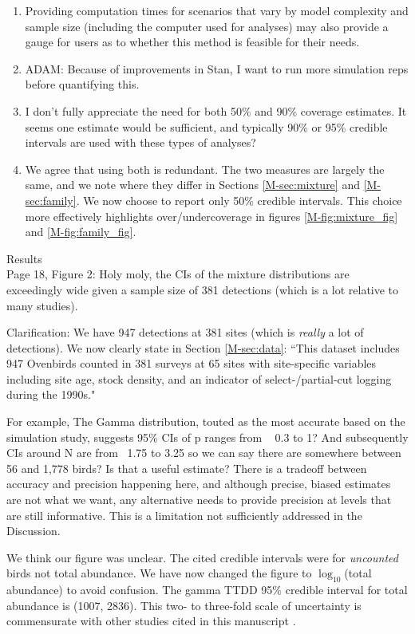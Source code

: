 \documentclass[12pt]{article}
\renewenvironment{quote}  %
              {\list{}{\rightmargin\leftmargin}\normalfont%
               \item\relax}
              {\endlist}
\newcommand{\adam}[1]{{\color{blue} ADAM: #1}}
\begin{document}
\begin{enumerate}
\item Providing computation times for scenarios that vary by model complexity and sample size (including the computer used for analyses) may also provide a gauge for users as to whether this method is feasible for their needs.
\begin{quote}
\adam{Because of improvements in Stan, I want to run more simulation reps before quantifying this.}
\end{quote}

\item I don’t fully appreciate the need for both 50\% and 90\% coverage estimates.  It seems one estimate would be sufficient, and typically 90\% or 95\% credible intervals are used with these types of analyses?
\begin{quote}
We agree that using both is redundant.
The two measures are largely the same, and we note where they differ in Sections \ref{M-sec:mixture} and \ref{M-sec:family}.
We now choose to report only 50\% credible intervals.
This choice more effectively highlights over/undercoverage in figures \ref{M-fig:mixture_fig} and \ref{M-fig:family_fig}.

\end{quote}
\end{enumerate}

Results\\
Page 18, Figure 2:  Holy moly, the CIs of the mixture distributions are exceedingly wide given a sample size of 381 detections (which is a lot relative to many studies).
\begin{quote}
Clarification: We have 947 detections at 381 sites (which is \textit{really} a lot of detections).
We now clearly state in Section \ref{M-sec:data}: ``This dataset includes 947 Ovenbirds counted in 381 surveys at 65 sites with site-specific variables including site age,  stock density, and an indicator of select-/partial-cut logging during the 1990s."
\end{quote}

For example, The Gamma distribution, touted as the most accurate based on the simulation study, suggests 95\% CIs of p ranges from ~ 0.3 to 1?  And subsequently CIs around N are from ~1.75 to 3.25 so we can say there are somewhere between 56 and 1,778  birds?
Is that a useful estimate?  There is a tradeoff between accuracy and precision happening here, and although precise, biased estimates are not what we want, any alternative needs to provide precision at levels that are still informative.  This is a limitation not sufficiently addressed in the Discussion.
\begin{quote} 
We think our figure was unclear.
The cited credible intervals were for \textit{uncounted} birds not total abundance.
We have now changed the figure to $\log_{10}$(total abundance) to avoid confusion.
The gamma TTDD 95\% credible interval for total abundance is (1007, 2836).
This two- to three-fold scale of uncertainty is commensurate with other studies cited in this manuscript \citep{Diefenbach2007, Reidy2011, Solymos2013, Amundson2014}.
\end{quote}
\end{document}
